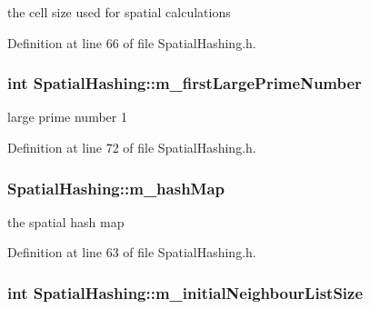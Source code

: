 the cell size used for spatial calculations 



Definition at line 66 of file SpatialHashing.h.

\hypertarget{class_spatial_hashing_a99c2a49c03963d35b4961c51642582b3}{
\subsubsection[{m\_\-firstLargePrimeNumber}]{\setlength{\rightskip}{0pt plus 5cm}int {\bf SpatialHashing::m\_\-firstLargePrimeNumber}}}
\label{class_spatial_hashing_a99c2a49c03963d35b4961c51642582b3}


large prime number 1 



Definition at line 72 of file SpatialHashing.h.

\hypertarget{class_spatial_hashing_aa4c4c1eaf23e54dd42cc982a4e53ceaf}{
\subsubsection[{m\_\-hashMap}]{ {\bf SpatialHashing::m\_\-hashMap}}}
\label{class_spatial_hashing_aa4c4c1eaf23e54dd42cc982a4e53ceaf}


the spatial hash map 



Definition at line 63 of file SpatialHashing.h.

\hypertarget{class_spatial_hashing_a553569ddd4a57714697c57b70e850d9d}{
\subsubsection[{m\_\-initialNeighbourListSize}]{\setlength{\rightskip}{0pt plus 5cm}int {\bf SpatialHashing::m\_\-initialNeighbourListSize}}}
\label{class_spatial_hashing_a553569ddd4a57714697c57b70e850d9d}


